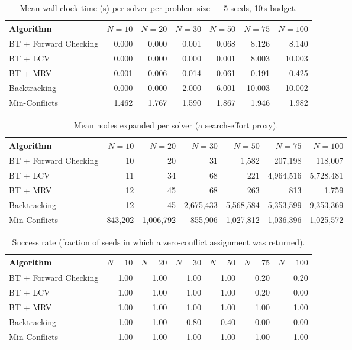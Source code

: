 \begin{table}[H]
\centering
\small
\caption{Mean wall-clock time (s) per solver per problem size — 5 seeds, 10\,s budget.}
\label{tab:time}
\begin{tabular}{lrrrrrr}
\toprule
Algorithm & $N{=}10$ & $N{=}20$ & $N{=}30$ & $N{=}50$ & $N{=}75$ & $N{=}100$ \\
\midrule
BT {+} Forward Checking & 0.000 & 0.000 & 0.001 & 0.068 & 8.126 & 8.140 \\
BT {+} LCV & 0.000 & 0.000 & 0.000 & 0.001 & 8.003 & 10.003 \\
BT {+} MRV & 0.001 & 0.006 & 0.014 & 0.061 & 0.191 & 0.425 \\
Backtracking & 0.000 & 0.000 & 2.000 & 6.001 & 10.003 & 10.002 \\
Min-Conflicts & 1.462 & 1.767 & 1.590 & 1.867 & 1.946 & 1.982 \\
\bottomrule
\end{tabular}
\end{table}

\begin{table}[H]
\centering
\small
\caption{Mean nodes expanded per solver (a search-effort proxy).}
\label{tab:nodes}
\begin{tabular}{lrrrrrr}
\toprule
Algorithm & $N{=}10$ & $N{=}20$ & $N{=}30$ & $N{=}50$ & $N{=}75$ & $N{=}100$ \\
\midrule
BT {+} Forward Checking & 10 & 20 & 31 & 1,582 & 207,198 & 118,007 \\
BT {+} LCV & 11 & 34 & 68 & 221 & 4,964,516 & 5,728,481 \\
BT {+} MRV & 12 & 45 & 68 & 263 & 813 & 1,759 \\
Backtracking & 12 & 45 & 2,675,433 & 5,568,584 & 5,353,599 & 9,353,369 \\
Min-Conflicts & 843,202 & 1,006,792 & 855,906 & 1,027,812 & 1,036,396 & 1,025,572 \\
\bottomrule
\end{tabular}
\end{table}

\begin{table}[H]
\centering
\small
\caption{Success rate (fraction of seeds in which a zero-conflict assignment was returned).}
\label{tab:solved}
\begin{tabular}{lrrrrrr}
\toprule
Algorithm & $N{=}10$ & $N{=}20$ & $N{=}30$ & $N{=}50$ & $N{=}75$ & $N{=}100$ \\
\midrule
BT {+} Forward Checking & 1.00 & 1.00 & 1.00 & 1.00 & 0.20 & 0.20 \\
BT {+} LCV & 1.00 & 1.00 & 1.00 & 1.00 & 0.20 & 0.00 \\
BT {+} MRV & 1.00 & 1.00 & 1.00 & 1.00 & 1.00 & 1.00 \\
Backtracking & 1.00 & 1.00 & 0.80 & 0.40 & 0.00 & 0.00 \\
Min-Conflicts & 1.00 & 1.00 & 1.00 & 1.00 & 1.00 & 1.00 \\
\bottomrule
\end{tabular}
\end{table}
